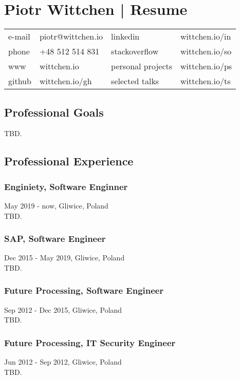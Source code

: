 \documentclass{article}
\begin{document}
  \section*{Piotr Wittchen | Resume}

  \begin{tabular}{llll}\small
    e-mail & piotr@wittchen.io & linkedin          & wittchen.io/in \\
    phone  & +48 512 514 831   & stackoverflow     & wittchen.io/so \\
    www    & wittchen.io       & personal projects & wittchen.io/ps \\
    github & wittchen.io/gh    & selected talks    & wittchen.io/ts \\
  \end{tabular}

    \subsection*{Professional Goals}
    TBD.
    
    \subsection*{Professional Experience}
    
      \subsubsection*{Enginiety, Software Enginner}
      May 2019 - now, Gliwice, Poland\\[0.3em] 
      TBD.
      
      \subsubsection*{SAP, Software Engineer} 
      Dec 2015 - May 2019, Gliwice, Poland\\[0.3em]
      TBD.

      \subsubsection*{Future Processing, Software Engineer}
      Sep 2012 - Dec 2015, Gliwice, Poland\\[0.3em]
      TBD.

      \subsubsection*{Future Processing, IT Security Engineer}
      Jun 2012 - Sep 2012, Gliwice, Poland\\[0.3em]
      TBD.
\end{document}
